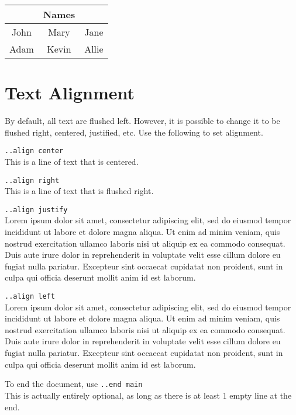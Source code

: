 \documentclass[12pt]{article}
\newcommand{\nl}{\\}
\begin{document}
\begin{flushleft}
\bigskip

\begin{tabular}{c|c|c}
& Names & \\
\hline
John & Mary & Jane \\
Adam & Kevin & Allie 
\end{tabular}

\newpage

\section*{Text Alignment}

By default, all text are flushed left. However, it is possible to change it to be flushed right, centered, justified, etc. Use the following to set alignment.

\end{flushleft}

\begin{center}
\verb|..align center|\nl
This is a line of text that is centered.

\end{center}

\begin{flushright}
\verb|..align right|\nl
This is a line of text that is flushed right.

\end{flushright}
\verb|..align justify|\nl
Lorem ipsum dolor sit amet, consectetur adipiscing elit, sed do eiusmod tempor incididunt ut labore et dolore magna aliqua. Ut enim ad minim veniam, quis nostrud exercitation ullamco laboris nisi ut aliquip ex ea commodo consequat. Duis aute irure dolor in reprehenderit in voluptate velit esse cillum dolore eu fugiat nulla pariatur. Excepteur sint occaecat cupidatat non proident, sunt in culpa qui officia deserunt mollit anim id est laborum.

\medskip


\begin{flushleft}
\verb|..align left|\nl
Lorem ipsum dolor sit amet, consectetur adipiscing elit, sed do eiusmod tempor incididunt ut labore et dolore magna aliqua. Ut enim ad minim veniam, quis nostrud exercitation ullamco laboris nisi ut aliquip ex ea commodo consequat. Duis aute irure dolor in reprehenderit in voluptate velit esse cillum dolore eu fugiat nulla pariatur. Excepteur sint occaecat cupidatat non proident, sunt in culpa qui officia deserunt mollit anim id est laborum.

\bigskip
\bigskip
\bigskip

To end the document, use \verb|..end main|\nl
This is actually entirely optional, as long as there is at least 1 empty line at the end.

\end{flushleft}
\end{document}
